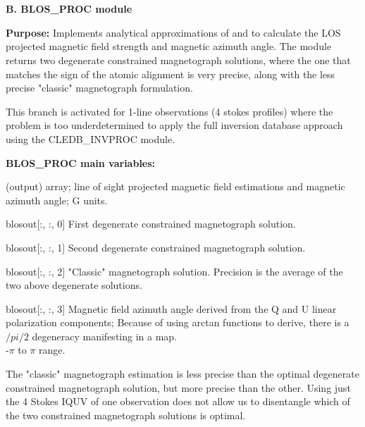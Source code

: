 \documentclass{article}
\begin{document}
~

~

\textbf{B. BLOS\_PROC module}

\textbf{Purpose:} Implements analytical approximations of \citet{1999ApJ...522..524C} and \citet{2020ApJ...889..109D} to calculate the LOS projected magnetic field strength and magnetic azimuth angle. The module returns two degenerate constrained magnetograph solutions, where the one that matches the sign of the atomic alignment is very precise, along with the less precise "classic" magnetograph formulation.

 This branch is activated for 1-line observations (4 stokes profiles) where the problem is too underdetermined to apply the full inversion database approach using the CLEDB\_INVPROC module.

\textbf{BLOS\_PROC main variables:}
\begin{description}
    [font=\normalfont,leftmargin=1.1in,style=multiline]
    \item[blosout]
        [nx,ny,4] (output) array; line of sight projected magnetic field estimations and magnetic azimuth angle; G units.
    \item[]        
        blosout[:, :, 0] First degenerate constrained magnetograph solution. 
    \item[]         
        blosout[:, :, 1] Second degenerate constrained magnetograph solution.
    \item[]         
        blosout[:, :, 2] "Classic" magnetograph solution. Precision is the average of the two above degenerate solutions. 
    \item[]
        blosout[:, :, 3] Magnetic field azimuth angle derived from the Q and U linear polarization components; Because of using arctan functions to derive, there is a $/pi/2$ degeneracy manifesting in a map.\\ -$\pi$ to $\pi$ range.
    \item[Note:]
    The "classic" magnetograph estimation is less precise than the optimal degenerate constrained magnetograph solution, but more precise than the other. Using just the 4 Stokes IQUV of one observation does not allow us to disentangle which of the two constrained magnetograph solutions is optimal.
                    
\end{description}
\end{document}
